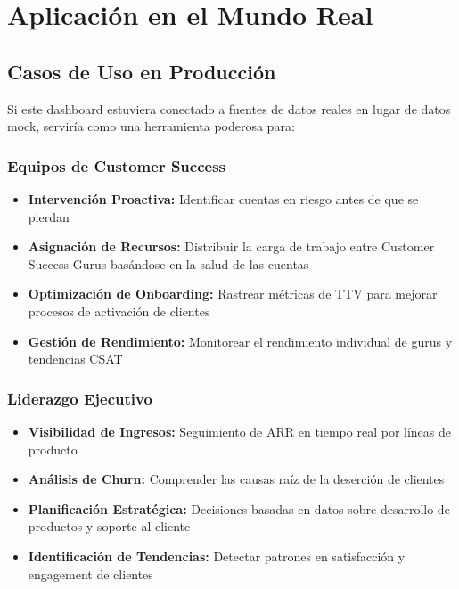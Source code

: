 \documentclass[12pt,a4paper]{article}
\begin{document}
\section{Aplicación en el Mundo Real}

\subsection{Casos de Uso en Producción}

Si este dashboard estuviera conectado a fuentes de datos reales en lugar de datos mock, serviría como una herramienta poderosa para:

\subsubsection{Equipos de Customer Success}
\begin{itemize}
    \item \textbf{Intervención Proactiva:} Identificar cuentas en riesgo antes de que se pierdan
    \item \textbf{Asignación de Recursos:} Distribuir la carga de trabajo entre Customer Success Gurus basándose en la salud de las cuentas
    \item \textbf{Optimización de Onboarding:} Rastrear métricas de TTV para mejorar procesos de activación de clientes
    \item \textbf{Gestión de Rendimiento:} Monitorear el rendimiento individual de gurus y tendencias CSAT
\end{itemize}

\subsubsection{Liderazgo Ejecutivo}
\begin{itemize}
    \item \textbf{Visibilidad de Ingresos:} Seguimiento de ARR en tiempo real por líneas de producto
    \item \textbf{Análisis de Churn:} Comprender las causas raíz de la deserción de clientes
    \item \textbf{Planificación Estratégica:} Decisiones basadas en datos sobre desarrollo de productos y soporte al cliente
    \item \textbf{Identificación de Tendencias:} Detectar patrones en satisfacción y engagement de clientes
\end{itemize}
\end{document}
